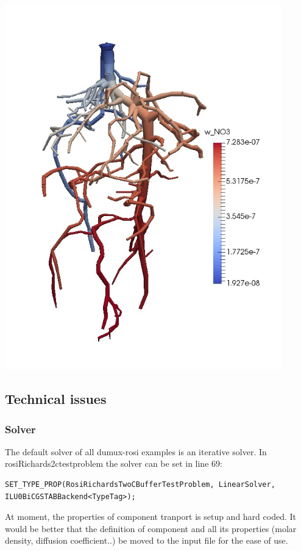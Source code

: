 \noindent\begin{minipage}[c]{1\columnwidth}%
\includegraphics[width=0.9\textwidth]{solutes}%
\end{minipage}

\subsection*{Technical issues}

\subsubsection*{Solver}

The default solver of all dumux-rosi examples is an iterative solver.
In rosiRichards2ctestproblem the solver can be set in line 69: 
\begin{lstlisting}
SET_TYPE_PROP(RosiRichardsTwoCBufferTestProblem, LinearSolver, ILU0BiCGSTABBackend<TypeTag>);
\end{lstlisting}

At moment, the properties of component tranport is setup and hard
coded. It would be better that the definition of component and all
its properties (molar density, diffusion coefficient..) be moved to
the input file for the ease of use.

